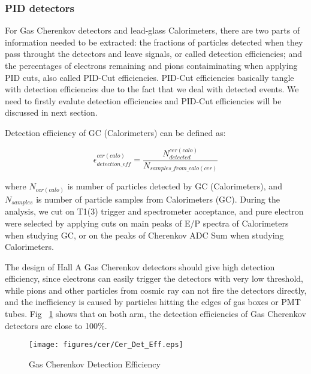 \documentclass[a4paper,10.5pt]{article}
\begin{document}
\subsubsection{PID detectors}

For Gas Cherenkov detectors and lead-glass Calorimeters, there are two parts of information needed to be extracted: the fractions of particles detected when they pass throught the detectors and leave signals, or called detection efficiencies; and the percentages of electrons remaining and pions contaiminating when applying PID cuts, also called PID-Cut efficiencies. PID-Cut efficiencies basically tangle with detection efficiencies due to the fact that we deal with detected events. We need to firstly evalute detection efficiencies and PID-Cut efficiencies will be discussed in next section. 

Detection efficiency of GC (Calorimeters) can be defined as:

\begin{equation}
 \epsilon_{detection\_eff}^{cer(calo)} = \frac{N_{detected}^{cer(calo)}}{N_{samples\_from\_calo(cer)}}
\end{equation}

where $N_{cer(calo)}$ is number of particles detected by GC (Calorimeters), and $N_{samples}$ is number of particle samples from Calorimeters (GC). During the analysis, we cut on T1(3) trigger and spectrometer acceptance, and pure electron were selected by applying cuts on main peaks of E/P spectra of Calorimeters when studying GC, or on the peaks of Cherenkov ADC Sum when studying Calorimeters. 

The design of Hall A Gas Cherenkov detectors should give high detection efficiency, since electrons can easily trigger the detectors with very low threshold, while pions and other particles from cosmic ray can not fire the detectors directly, and the inefficiency is caused by particles hitting the edges of gas boxes or PMT tubes. Fig ~\ref{cer_det_eff} shows that on both arm, the detection efficiencies of Gas Cherenkov detectors are close to 100\%.

\begin{figure}[h!]
\centerline{\texttt{[image: figures/cer/Cer\_Det\_Eff.eps]}}
\caption[Gas Cherenkov Detection Efficiency]{\footnotesize{Gas Cherenkov Detection Efficiency}}
\label{cer_det_eff}
\end{figure}
\end{document}

